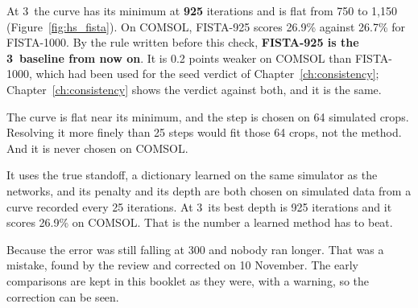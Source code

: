 At 3\um\ the curve has its minimum at \textbf{925} iterations and is flat from 750 to 1{,}150
(Figure~\ref{fig:hs_fista}). On COMSOL, FISTA-925 scores 26.9\% against 26.7\% for FISTA-1000. By the rule written
before this check, \textbf{FISTA-925 is the 3\um\ baseline from now on}. It is 0.2 points weaker on COMSOL than FISTA-1000,
which had been used for the seed verdict of Chapter~\ref{ch:consistency}; Chapter~\ref{ch:consistency} shows the verdict
against both, and it is the same.

\begin{careful}
The curve is flat near its minimum, and the step is chosen on 64 simulated crops. Resolving it more finely than 25
steps would fit those 64 crops, not the method. And it is never chosen on COMSOL.
\end{careful}

\begin{defend}
It uses the true standoff, a dictionary learned on the same simulator as the networks, and its penalty and its depth
are both chosen on simulated data from a curve recorded every 25 iterations. At 3\um\ its best depth is 925 iterations
and it scores 26.9\% on COMSOL. That is the number a learned method has to beat.
\end{defend}

\begin{defend}
Because the error was still falling at 300 and nobody ran longer. That was a mistake, found by the review and
corrected on 10 November. The early comparisons are kept in this booklet as they were, with a warning, so the
correction can be seen.
\end{defend}
